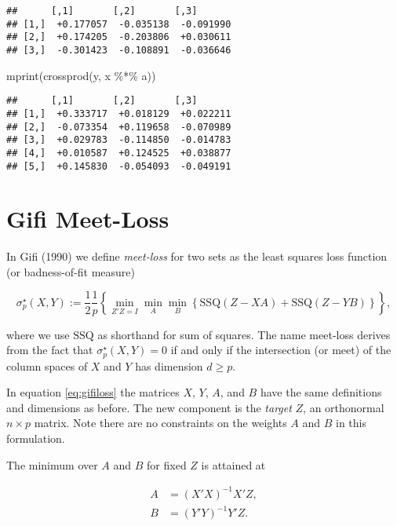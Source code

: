 \documentclass[
  12pt,
]{article}
\newenvironment{Shaded}{\begin{snugshade}}{\end{snugshade}}
\newcommand{\FunctionTok}[1]{\textcolor[rgb]{0.00,0.00,0.00}{#1}}
\newcommand{\NormalTok}[1]{#1}
\newcommand{\SpecialCharTok}[1]{\textcolor[rgb]{0.00,0.00,0.00}{#1}}
\begin{document}
\begin{verbatim}
##      [,1]       [,2]       [,3]      
## [1,]  +0.177057  -0.035138  -0.091990
## [2,]  +0.174205  -0.203806  +0.030611
## [3,]  -0.301423  -0.108891  -0.036646
\end{verbatim}

\begin{Shaded}
\begin{Highlighting}[]
\FunctionTok{mprint}\NormalTok{(}\FunctionTok{crossprod}\NormalTok{(y, x }\SpecialCharTok{\%*\%}\NormalTok{ a))}
\end{Highlighting}
\end{Shaded}

\begin{verbatim}
##      [,1]       [,2]       [,3]      
## [1,]  +0.333717  +0.018129  +0.022211
## [2,]  -0.073354  +0.119658  -0.070989
## [3,]  +0.029783  -0.114850  -0.014783
## [4,]  +0.010587  +0.124525  +0.038877
## [5,]  +0.145830  -0.054093  -0.049191
\end{verbatim}

\hypertarget{gifi-meet-loss}{%
\section{Gifi Meet-Loss}\label{gifi-meet-loss}}

In Gifi (1990) we define \emph{meet-loss} for two sets as the least squares loss function (or badness-of-fit measure)

\begin{equation}
\sigma_p^\star(X,Y):=\frac12\frac{1}{p}\left\{\min_{Z'Z=I}\min_{A}\min_{B}\left\{\text{SSQ}(Z-XA)+\text{SSQ}(Z-YB)\right\}\right\},
\label{eq:gifiloss}
\end{equation}

where we use \(\text{SSQ}\) as shorthand for sum of squares. The name meet-loss derives from the fact that \(\sigma_p^\star(X,Y)=0\)
if and only if the intersection (or meet) of the column spaces of \(X\) and \(Y\) has dimension \(d\geq p\).

In equation \eqref{eq:gifiloss} the matrices \(X\), \(Y\), \(A\), and \(B\) have the same definitions and dimensions as before. The new component is the \emph{target} \(Z\), an orthonormal \(n\times p\) matrix. Note there are no constraints on the weights \(A\) and \(B\) in this formulation.

The minimum over \(A\) and \(B\) for fixed \(Z\) is attained at

\begin{align}
A&=(X'X)^{-1}X'Z,\label{eq:aforz}\\ 
B&=(Y'Y)^{-1}Y'Z.\label{eq:bforz}
\end{align}
\end{document}
